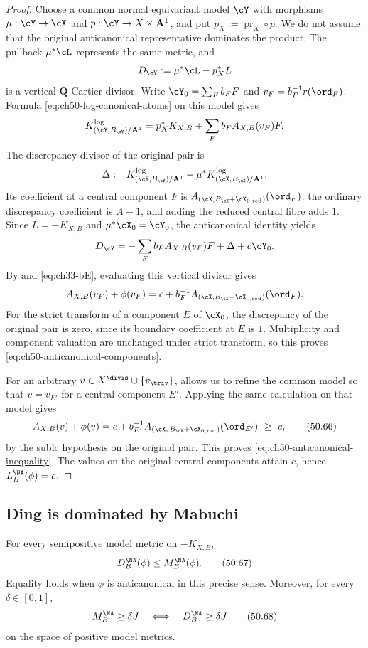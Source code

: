\begin{proof}
Choose a common normal equivariant model $\cY$ with morphisms
$\mu:\cY\to\cX$ and $p:\cY\to X\times\mathbf A^1$, and put
$p_X:=\operatorname{pr}_X\circ p$.  We do not assume that the original
anticanonical representative dominates the product.  The pullback
$\mu^*\cL$ represents the same metric, and
\[
 D_{\cY}:=\mu^*\cL-p_X^*L
\]
is a vertical $\mathbf Q$-Cartier divisor.  Write
$\cY_0=\sum_F b_FF$ and $v_F=b_F^{-1}r(\ord_F)$.  Formula
\eqref{eq:ch50-log-canonical-atoms} on this model gives
\[
 K^{\log}_{(\cY,B_{\cY})/\mathbf A^1}
 =p_X^*K_{X,B}+\sum_F b_FA_{X,B}(v_F)F.
\]
The discrepancy divisor of the original pair is
\[
 \Delta:=K^{\log}_{(\cY,B_{\cY})/\mathbf A^1}
          -\mu^*K^{\log}_{(\cX,B_{\cX})/\mathbf A^1}.
\]
Its coefficient at a central component $F$ is
$A_{(\cX,B_{\cX}+\cX_{0,\mathrm{red}})}(\ord_F)$: the ordinary
discrepancy coefficient is $A-1$, and adding the reduced central fibre
adds $1$.  Since $L=-K_{X,B}$ and
$\mu^*\cX_0=\cY_0$, the anticanonical identity yields
\[
 D_{\cY}=-\sum_F b_FA_{X,B}(v_F)F+\Delta+c\cY_0.
\]
By  and \eqref{eq:ch33-bE}, evaluating this
vertical divisor gives
\[
 A_{X,B}(v_F)+\phi(v_F)
 =c+b_F^{-1}A_{(\cX,B_{\cX}+\cX_{0,\mathrm{red}})}(\ord_F).
\]
For the strict transform of a component $E$ of $\cX_0$, the discrepancy
of the original pair is zero, since its boundary coefficient at $E$ is
$1$.  Multiplicity and component valuation are unchanged under strict
transform, so this proves \eqref{eq:ch50-anticanonical-components}.

For an arbitrary $v\in X^{\divis}\cup\{v_{\triv}\}$,
 allows us to refine the common model
so that $v=v_{E'}$ for a central component $E'$.  Applying the same
calculation on that model gives
\[
 A_{X,B}(v)+\phi(v)
 =c+b_{E'}^{-1}A_{(\cX,\,B_\cX+\cX_{0,\mathrm{red}})}(\ord_{E'})
 \ \ge\ c,
\tag{50.66}\label{eq:ch50-anticanonical-defect}
\]
by the sublc hypothesis on the original pair.  This proves
\eqref{eq:ch50-anticanonical-inequality}.  The values on the original
central components attain $c$, hence $L^{\NA}_B(\phi)=c$.
\end{proof}

\subsection{Ding is dominated by Mabuchi}
\label{sec:ch50-ding-mabuchi}

\begin{theorem}\label{thm:stability-ding-mabuchi}
For every semipositive model metric on $-K_{X,B}$,
\[
                        D_B^{\NA}(\phi)\leq M_B^{\NA}(\phi).
\tag{50.67}\label{eq:stability-ding-less-M}
\]
Equality holds when $\phi$ is anticanonical in this precise sense.
Moreover, for every
$\delta\in[0,1]$,
\[
 M_B^{\NA}\geq\delta J
 \quad\Longleftrightarrow\quad
 D_B^{\NA}\geq\delta J
\tag{50.68}\label{eq:stability-ding-M-uniform}
\]
on the space of positive model metrics.
\end{theorem}

